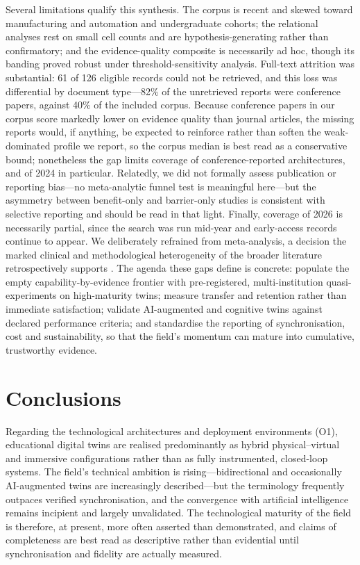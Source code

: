 Several limitations qualify this synthesis. The corpus is recent and skewed
toward manufacturing and automation and undergraduate cohorts; the
relational analyses rest on small cell counts and are hypothesis-generating rather
than confirmatory; and the evidence-quality composite is necessarily ad hoc,
though its banding proved robust under threshold-sensitivity analysis. Full-text
attrition was substantial: 61 of 126 eligible records could not be retrieved, and
this loss was differential by document type---82\% of the unretrieved reports were
conference papers, against 40\% of the included corpus. Because conference papers in
our corpus score markedly lower on evidence quality than journal articles, the
missing reports would, if anything, be expected to reinforce rather than soften the
weak-dominated profile we report, so the corpus median is best read as a
conservative bound; nonetheless the gap limits coverage of conference-reported
architectures, and of 2024 in particular. Relatedly, we did not formally assess
publication or reporting bias---no meta-analytic funnel test is meaningful here---but
the asymmetry between benefit-only and barrier-only studies is consistent with
selective reporting and should be read in that light. Finally, coverage of 2026 is
necessarily partial, since the search was run mid-year and early-access records
continue to appear. We
deliberately refrained from meta-analysis, a decision the marked clinical and
methodological heterogeneity of the broader literature retrospectively supports
\cite{widowati_meta-analysis_2025}. The agenda these gaps define is concrete: populate the
empty capability-by-evidence frontier with pre-registered, multi-institution
quasi-experiments on high-maturity twins; measure transfer and retention rather
than immediate satisfaction; validate AI-augmented and cognitive twins against
declared performance criteria; and standardise the reporting of synchronisation,
cost and sustainability, so that the field's momentum can mature into cumulative,
trustworthy evidence.

\section{Conclusions}\label{conclusions}

Regarding the technological architectures and deployment environments (O1),
educational digital twins are realised predominantly as hybrid physical--virtual
and immersive configurations rather than as fully instrumented, closed-loop
systems. The field's technical ambition is rising---bidirectional and occasionally
AI-augmented twins are increasingly described---but the terminology frequently
outpaces verified synchronisation, and the convergence with artificial
intelligence remains incipient and largely unvalidated. The technological maturity
of the field is therefore, at present, more often asserted than demonstrated, and
claims of completeness are best read as descriptive rather than evidential until
synchronisation and fidelity are actually measured.

